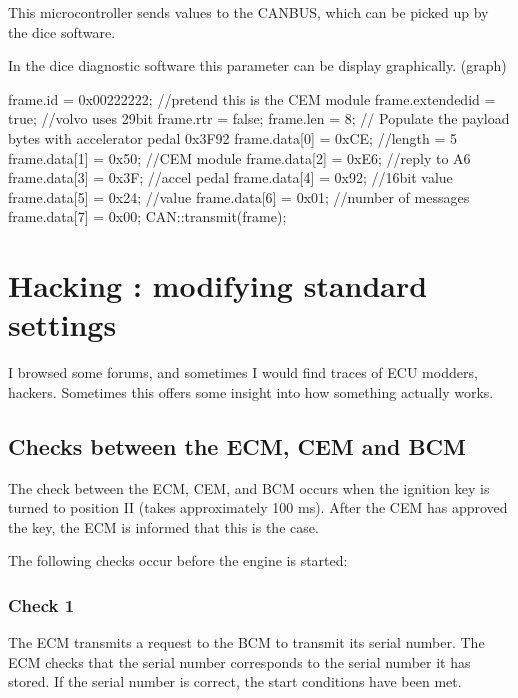 \documentclass[letterpaper,10pt,english]{sphinxmanual}
\begin{document}
\sphinxAtStartPar
This microcontroller sends values to the CANBUS, which can be picked up by the dice software.

\sphinxAtStartPar
In the dice diagnostic software this parameter can be display graphically. (graph)

\begin{sphinxVerbatim}[commandchars=\\\{\}]
frame.id = 0x00222222; //pretend this is the CEM module
frame.extended\PYGZus{}id = true; //volvo uses 29bit
frame.rtr = false;
frame.len = 8;
// Populate the payload bytes with accelerator pedal 0x3F92
frame.data[0] = 0xCE; //length = 5
frame.data[1] = 0x50; //CEM module
frame.data[2] = 0xE6; //reply to A6
frame.data[3] = 0x3F; //accel pedal
frame.data[4] = 0x92; //16bit value
frame.data[5] = 0x24; //value
frame.data[6] = 0x01; //number of messages
frame.data[7] = 0x00;
CAN::transmit(frame);
\end{sphinxVerbatim}


\chapter{Hacking : modifying standard settings}
\label{\detokenize{hacking/index:hacking-modifying-standard-settings}}\label{\detokenize{hacking/index::doc}}
\sphinxAtStartPar
I browsed some forums, and sometimes I would find traces of ECU modders, hackers.
Sometimes this offers some insight into how something actually works.


\section{Checks between the ECM, CEM and BCM}
\label{\detokenize{hacking/checks:checks-between-the-ecm-cem-and-bcm}}\label{\detokenize{hacking/checks::doc}}
\sphinxAtStartPar
The check between the ECM, CEM, and BCM occurs when the ignition key is turned to position II (takes approximately 100 ms). After the CEM has approved the key, the ECM is informed that this is the case.

\sphinxAtStartPar
The following checks occur before the engine is started:


\subsection{Check 1}
\label{\detokenize{hacking/checks:check-1}}
\sphinxAtStartPar
The ECM transmits a request to the BCM to transmit its serial number. The ECM checks that the serial number corresponds to the serial number it has stored. If the serial number is correct, the start conditions have been met.
\end{document}
